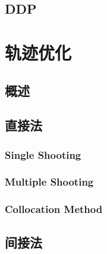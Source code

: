 \section{DDP}

\chapter{轨迹优化}
\section{概述}
\section{直接法}
\subsection{Single Shooting}
\subsection{Multiple Shooting}
\subsection{Collocation Method}
\section{间接法}





